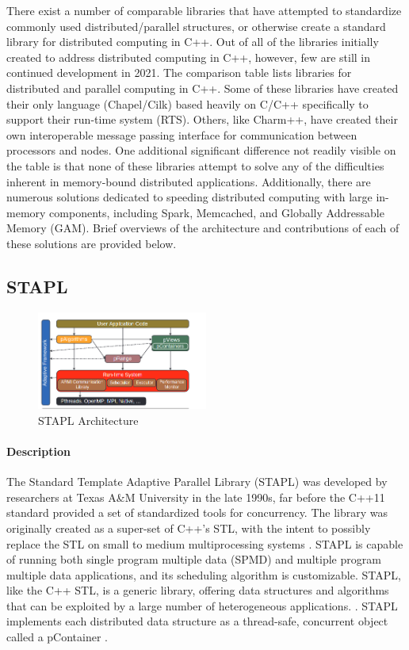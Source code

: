 There exist a number of comparable libraries that have attempted to standardize commonly used distributed/parallel structures, or otherwise create a standard library for distributed computing in C++. Out of all of the libraries initially created to address distributed computing in C++, however, few are still in continued development in 2021. The comparison table lists libraries for distributed and parallel computing in C++. Some of these libraries have created their only language (Chapel/Cilk) based heavily on C/C++ specifically to support their run-time system (RTS). Others, like Charm++, have created their own interoperable message passing interface for communication between processors and nodes.  One additional significant difference not readily visible on the table is that none of these libraries attempt to solve any of the difficulties inherent in memory-bound distributed applications. Additionally, there are numerous solutions dedicated to speeding distributed computing with large in-memory components, including Spark, Memcached, and Globally Addressable Memory (GAM). Brief overviews of the architecture and contributions of each of these solutions are provided below.   

\subsection{STAPL}
\begin{figure}[h]
\centering
\includegraphics[width=0.5\textwidth]{Figures/stapl_overview.png}
\caption{STAPL Architecture \cite{stapl_parallel_container}}
\label{fig:stapl_arch}
\end{figure}
\paragraph{Description} 
The Standard Template Adaptive Parallel Library (STAPL) was developed by researchers at Texas A\&M University in the late 1990s, far before the C++11 standard provided a set of standardized tools for concurrency. The library was originally created as a super-set of C++'s STL, with the intent to possibly replace the STL on small to medium multiprocessing systems \cite{STAPL}. STAPL is capable of running both single program multiple data (SPMD) and multiple program multiple data applications, and its scheduling algorithm is customizable. STAPL, like the C++ STL, is a generic library, offering data structures and algorithms that can be exploited by a large number of heterogeneous applications. \cite{STAPL}. STAPL implements each distributed data structure as a thread-safe, concurrent object called a pContainer \cite{stapl_parallel_container}. 

